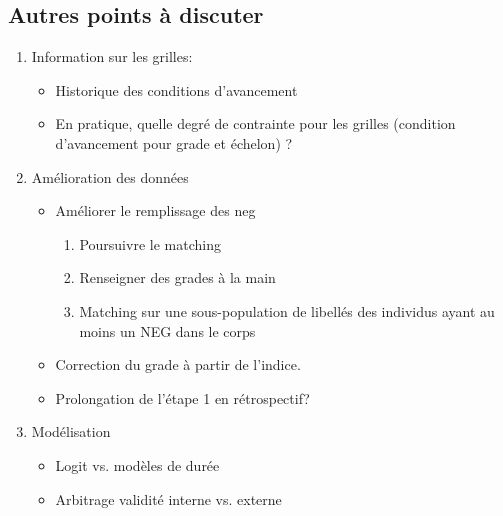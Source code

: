 \documentclass[11pt,a4paper]{article}
\begin{document}
\subsection*{Autres points à discuter}


\begin{enumerate}

\item Information sur les grilles: 
\begin{itemize}[leftmargin=1cm ,parsep=0cm,itemsep=0cm,topsep=0cm] 
\item Historique des conditions d'avancement
\item En pratique, quelle degré de contrainte pour les grilles (condition d'avancement pour grade et échelon) ? 
\end{itemize}

\item Amélioration des données 
\begin{itemize}[leftmargin=1cm ,parsep=0cm,itemsep=0cm,topsep=0cm] 
\item Améliorer le remplissage des neg 
	\begin{enumerate}[leftmargin=1cm ,parsep=0cm,itemsep=0cm,topsep=0cm] 
	\item Poursuivre le matching
	\item Renseigner des grades à la main 
	\item Matching sur une sous-population de libellés des individus ayant au moins un NEG dans le corps
	\end{enumerate}
\item Correction du grade à partir de l'indice. 
\item Prolongation de l'étape 1 en rétrospectif?
\end{itemize}

\item Modélisation
\begin{itemize}
\item Logit vs. modèles de durée
\item Arbitrage validité interne vs. externe
\end{itemize}



\end{enumerate}
\end{document}
